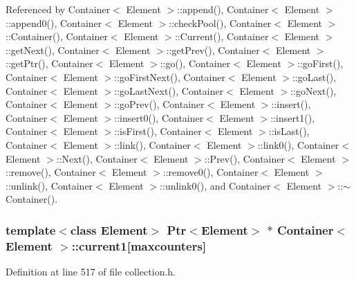 Referenced by Container$<$ Element $>$::append(), Container$<$ Element $>$::append0(), Container$<$ Element $>$::checkPool(), Container$<$ Element $>$::Container(), Container$<$ Element $>$::Current(), Container$<$ Element $>$::getNext(), Container$<$ Element $>$::getPrev(), Container$<$ Element $>$::getPtr(), Container$<$ Element $>$::go(), Container$<$ Element $>$::goFirst(), Container$<$ Element $>$::goFirstNext(), Container$<$ Element $>$::goLast(), Container$<$ Element $>$::goLastNext(), Container$<$ Element $>$::goNext(), Container$<$ Element $>$::goPrev(), Container$<$ Element $>$::insert(), Container$<$ Element $>$::insert0(), Container$<$ Element $>$::insert1(), Container$<$ Element $>$::isFirst(), Container$<$ Element $>$::isLast(), Container$<$ Element $>$::link(), Container$<$ Element $>$::link0(), Container$<$ Element $>$::Next(), Container$<$ Element $>$::Prev(), Container$<$ Element $>$::remove(), Container$<$ Element $>$::remove0(), Container$<$ Element $>$::unlink(), Container$<$ Element $>$::unlink0(), and Container$<$ Element $>$::$\sim$Container().\hypertarget{classContainer_32042ccd45f4de7143ab4ba2a719452c}{
\subsubsection[{current1}]{\setlength{\rightskip}{0pt plus 5cm}template$<$class Element$>$ {\bf Ptr}$<$Element$>$ $\ast$ {\bf Container}$<$ Element $>$::{\bf current1}\mbox{[}{\bf maxcounters}\mbox{]}}}
\label{classContainer_32042ccd45f4de7143ab4ba2a719452c}




Definition at line 517 of file collection.h.

